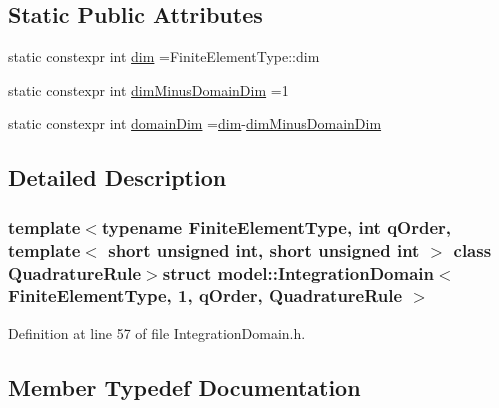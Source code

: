 \subsection*{Static Public Attributes}
\begin{DoxyCompactItemize}
\item 
static constexpr int \hyperlink{structmodel_1_1_integration_domain_3_01_finite_element_type_00_011_00_01q_order_00_01_quadrature_rule_01_4_ac6b2db0e39e49028b80c918a7450b815}{dim} =Finite\+Element\+Type\+::dim
\item 
static constexpr int \hyperlink{structmodel_1_1_integration_domain_3_01_finite_element_type_00_011_00_01q_order_00_01_quadrature_rule_01_4_a6e8e93aabff3aad5399c80ef79ed616d}{dim\+Minus\+Domain\+Dim} =1
\item 
static constexpr int \hyperlink{structmodel_1_1_integration_domain_3_01_finite_element_type_00_011_00_01q_order_00_01_quadrature_rule_01_4_a4794e96f792f2344e4ac5842f50f3fa3}{domain\+Dim} =\hyperlink{structmodel_1_1_integration_domain_3_01_finite_element_type_00_011_00_01q_order_00_01_quadrature_rule_01_4_ac6b2db0e39e49028b80c918a7450b815}{dim}-\/\hyperlink{structmodel_1_1_integration_domain_3_01_finite_element_type_00_011_00_01q_order_00_01_quadrature_rule_01_4_a6e8e93aabff3aad5399c80ef79ed616d}{dim\+Minus\+Domain\+Dim}
\end{DoxyCompactItemize}


\subsection{Detailed Description}
\subsubsection*{template$<$typename Finite\+Element\+Type, int q\+Order, template$<$ short unsigned int, short unsigned int $>$ class Quadrature\+Rule$>$struct model\+::\+Integration\+Domain$<$ Finite\+Element\+Type, 1, q\+Order, Quadrature\+Rule $>$}



Definition at line 57 of file Integration\+Domain.\+h.



\subsection{Member Typedef Documentation}
\hypertarget{structmodel_1_1_integration_domain_3_01_finite_element_type_00_011_00_01q_order_00_01_quadrature_rule_01_4_a7e1987441ecbe7f224f67657f97d115e}{}

